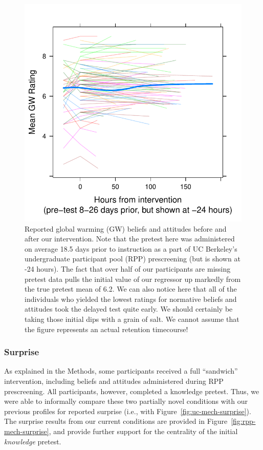 \begin{figure}
    \centering
    \includegraphics{RPP-mech-GW.pdf}
    \caption{Reported global warming (GW) beliefs and attitudes before and after
        our intervention. Note that the pretest here was administered on average
        18.5 days prior to instruction as a part of UC Berkeley's undergraduate
        participant pool (RPP) prescreening (but is shown at -24 hours). The
        fact that over half of our participants are missing pretest data pulls
        the initial value of our regressor up markedly from the true pretest
        mean of 6.2.  We can also notice here that all of the individuals who
        yielded the lowest ratings for normative beliefs and attitudes took the
        delayed test quite early. We should certainly be taking those initial
        dips with a grain of salt. We cannot assume that the figure represents
        an actual retention timecourse!}
    \label{fig:RPP-mech-GW}
\end{figure}


\subsubsection{Surprise}

As explained in the Methods, some participants received a full “sandwich”
intervention, including beliefs and attitudes administered during RPP
prescreening. All participants, however, completed a knowledge pretest. Thus,
we were able to informally compare these two partially novel conditions with our
previous profiles for reported surprise (i.e., with
Figure~\ref{fig:uc-mech-surprise}). The surprise results from our current
conditions are provided in Figure~\ref{fig:rpp-mech-surprise}, and provide
further support for the centrality of the initial \emph{knowledge} pretest.

